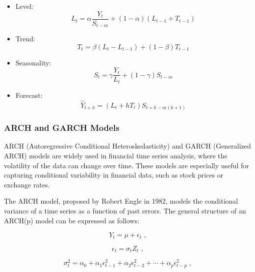 \begin{itemize}
    \item Level:
    \begin{equation}
    L_t = \alpha \frac{Y_t}{S_{t-m}} + (1-\alpha)(L_{t-1} + T_{t-1})
    \end{equation}
    \item Trend:
    \begin{equation}
    T_t = \beta (L_t - L_{t-1}) + (1-\beta) T_{t-1}
    \end{equation}
    \item Seasonality:
    \begin{equation}
    S_t = \gamma \frac{Y_t}{L_t} + (1-\gamma) S_{t-m}
    \end{equation}
    \item Forecast:
    \begin{equation}
    \hat{Y}_{t+h} = (L_t + h T_t) S_{t+h-m(k+1)}
    \end{equation}
\end{itemize}
\vspace{10pt}

\subsubsection{ARCH and GARCH Models}

ARCH (Autoregressive Conditional Heteroskedasticity) and GARCH (Generalized ARCH) models are widely used in financial time series analysis, where the volatility of the data can change over time. These models are especially useful for capturing conditional variability in financial data, such as stock prices or exchange rates.
\vspace{10pt}

The ARCH model, proposed by Robert Engle in 1982, models the conditional variance of a time series as a function of past errors. The general structure of an ARCH(p) model can be expressed as follows:

\begin{equation}
Y_t = \mu + \epsilon_t \text{ ,}
\end{equation}

\begin{equation}
\epsilon_t = \sigma_t Z_t \text{ ,}
\end{equation}

\begin{equation}
\sigma_t^2 = \alpha_0 + \alpha_1 \epsilon_{t-1}^2 + \alpha_2 \epsilon_{t-2}^2 + \cdots + \alpha_p \epsilon_{t-p}^2 \text{ ,}
\end{equation}

